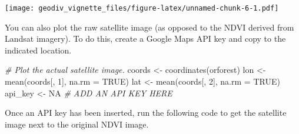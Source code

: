 \documentclass[
]{article}
\newenvironment{Shaded}{\begin{snugshade}}{\end{snugshade}}
\newcommand{\AttributeTok}[1]{\textcolor[rgb]{0.77,0.63,0.00}{#1}}
\newcommand{\CommentTok}[1]{\textcolor[rgb]{0.56,0.35,0.01}{\textit{#1}}}
\newcommand{\ConstantTok}[1]{\textcolor[rgb]{0.00,0.00,0.00}{#1}}
\newcommand{\DecValTok}[1]{\textcolor[rgb]{0.00,0.00,0.81}{#1}}
\newcommand{\FunctionTok}[1]{\textcolor[rgb]{0.00,0.00,0.00}{#1}}
\newcommand{\NormalTok}[1]{#1}
\newcommand{\OtherTok}[1]{\textcolor[rgb]{0.56,0.35,0.01}{#1}}
\begin{document}
\texttt{[image: geodiv\_vignette\_files/figure-latex/unnamed-chunk-6-1.pdf]}

You can also plot the raw satellite image (as opposed to the NDVI
derived from Landsat imagery). To do this, create a Google Maps API key
and copy to the indicated location.

\begin{Shaded}
\begin{Highlighting}[]
\CommentTok{\# Plot the actual satellite image.}
\NormalTok{coords }\OtherTok{\textless{}{-}} \FunctionTok{coordinates}\NormalTok{(orforest)}
\NormalTok{lon }\OtherTok{\textless{}{-}} \FunctionTok{mean}\NormalTok{(coords[, }\DecValTok{1}\NormalTok{], }\AttributeTok{na.rm =} \ConstantTok{TRUE}\NormalTok{)}
\NormalTok{lat }\OtherTok{\textless{}{-}} \FunctionTok{mean}\NormalTok{(coords[, }\DecValTok{2}\NormalTok{], }\AttributeTok{na.rm =} \ConstantTok{TRUE}\NormalTok{)}
\NormalTok{api\_key }\OtherTok{\textless{}{-}} \ConstantTok{NA} \CommentTok{\# ADD AN API KEY HERE}
\end{Highlighting}
\end{Shaded}

Once an API key has been inserted, run the following code to get the
satellite image next to the original NDVI image.
\end{document}
